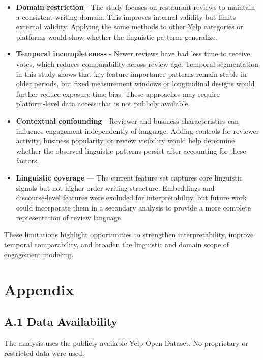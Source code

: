 \documentclass[
]{article}
\begin{document}
\begin{itemize}
\item
  \textbf{Domain restriction} - The study focuses on restaurant reviews
  to maintain a consistent writing domain. This improves internal
  validity but limits external validity. Applying the same methods to
  other Yelp categories or platforms would show whether the linguistic
  patterns generalize.
\item
  \textbf{Temporal incompleteness} - Newer reviews have had less time to
  receive votes, which reduces comparability across review age. Temporal
  segmentation in this study shows that key feature‑importance patterns
  remain stable in older periods, but fixed measurement windows or
  longitudinal designs would further reduce exposure‑time bias. These
  approaches may require platform‑level data access that is not publicly
  available.
\item
  \textbf{Contextual confounding} - Reviewer and business
  characteristics can influence engagement independently of language.
  Adding controls for reviewer activity, business popularity, or review
  visibility would help determine whether the observed linguistic
  patterns persist after accounting for these factors.
\item
  \textbf{Linguistic coverage} --- The current feature set captures core
  linguistic signals but not higher‑order writing structure. Embeddings
  and discourse‑level features were excluded for interpretability, but
  future work could incorporate them in a secondary analysis to provide
  a more complete representation of review language.
\end{itemize}

These limitations highlight opportunities to strengthen
interpretability, improve temporal comparability, and broaden the
linguistic and domain scope of engagement modeling.

\hypertarget{appendix}{%
\section{Appendix}\label{appendix}}

\hypertarget{a.1-data-availability}{%
\subsection{A.1 Data Availability}\label{a.1-data-availability}}

The analysis uses the publicly available Yelp Open Dataset. No
proprietary or restricted data were used.
\end{document}

